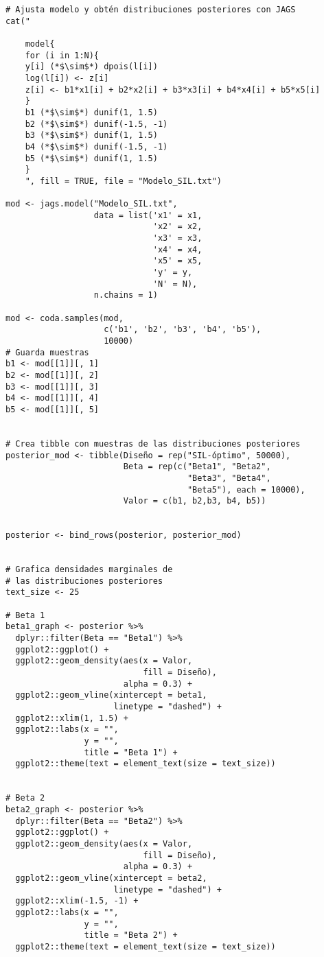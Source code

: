 \begin{lstlisting}
# Ajusta modelo y obtén distribuciones posteriores con JAGS
cat("
    
    model{
    for (i in 1:N){
    y[i] (*$\sim$*) dpois(l[i])
    log(l[i]) <- z[i]
    z[i] <- b1*x1[i] + b2*x2[i] + b3*x3[i] + b4*x4[i] + b5*x5[i]
    }
    b1 (*$\sim$*) dunif(1, 1.5)
    b2 (*$\sim$*) dunif(-1.5, -1)
    b3 (*$\sim$*) dunif(1, 1.5)
    b4 (*$\sim$*) dunif(-1.5, -1)
    b5 (*$\sim$*) dunif(1, 1.5)
    }
    ", fill = TRUE, file = "Modelo_SIL.txt")

mod <- jags.model("Modelo_SIL.txt",
                  data = list('x1' = x1,
                              'x2' = x2,
                              'x3' = x3,
                              'x4' = x4,
                              'x5' = x5,
                              'y' = y,
                              'N' = N),
                  n.chains = 1)

mod <- coda.samples(mod,
                    c('b1', 'b2', 'b3', 'b4', 'b5'),
                    10000)
# Guarda muestras
b1 <- mod[[1]][, 1]
b2 <- mod[[1]][, 2]
b3 <- mod[[1]][, 3]
b4 <- mod[[1]][, 4]
b5 <- mod[[1]][, 5]


# Crea tibble con muestras de las distribuciones posteriores
posterior_mod <- tibble(Diseño = rep("SIL-óptimo", 50000),
                        Beta = rep(c("Beta1", "Beta2",
                                     "Beta3", "Beta4",
                                     "Beta5"), each = 10000),
                        Valor = c(b1, b2,b3, b4, b5))


posterior <- bind_rows(posterior, posterior_mod)


# Grafica densidades marginales de 
# las distribuciones posteriores
text_size <- 25

# Beta 1
beta1_graph <- posterior %>% 
  dplyr::filter(Beta == "Beta1") %>% 
  ggplot2::ggplot() + 
  ggplot2::geom_density(aes(x = Valor,
                            fill = Diseño),
                        alpha = 0.3) +
  ggplot2::geom_vline(xintercept = beta1,
                      linetype = "dashed") + 
  ggplot2::xlim(1, 1.5) +
  ggplot2::labs(x = "",
                y = "",
                title = "Beta 1") +
  ggplot2::theme(text = element_text(size = text_size))


# Beta 2
beta2_graph <- posterior %>% 
  dplyr::filter(Beta == "Beta2") %>% 
  ggplot2::ggplot() + 
  ggplot2::geom_density(aes(x = Valor,
                            fill = Diseño),
                        alpha = 0.3) +
  ggplot2::geom_vline(xintercept = beta2,
                      linetype = "dashed") + 
  ggplot2::xlim(-1.5, -1) +
  ggplot2::labs(x = "",
                y = "",
                title = "Beta 2") +
  ggplot2::theme(text = element_text(size = text_size))



\end{lstlisting}
